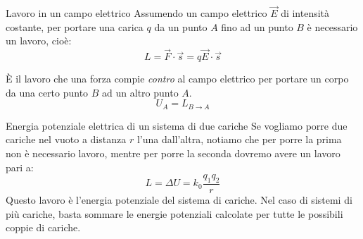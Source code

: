 \documentclass[a4paper,11pt,italian]{article}
\begin{document}
\begin{description}
\begin{soloscientifico} %
  
  \item[Lavoro in un campo elettrico] 
  Assumendo un campo elettrico $ \vec{E} $ di intensità costante, per portare una carica $ q $ da un punto $ A $ fino ad un punto $ B $ è necessario un lavoro, cioè:
  \[ L = \vec{F} \cdot \vec{s} = q \vec{E} \cdot \vec{s}  \]\end{soloscientifico}   %

  \item[Energia potenziale elettrica in \textit{A} (rispetto a \textit{B})] 
  È il lavoro che una forza compie \emph{contro} al campo elettrico per portare un corpo da una certo punto $ B $ ad un altro punto $ A $.
  \[ U_A = L_{B\rightarrow A} \]
  
\begin{soloscientifico} %
  \item[Energia potenziale elettrica di un sistema di due cariche] 
  Se vogliamo porre due cariche nel vuoto a distanza $ r $ l'una dall'altra, notiamo che per porre la prima non è necessario lavoro, mentre per porre la seconda dovremo avere un lavoro pari a:
  \[ L = \Delta U = k_0 \frac{q_1 q_2}{r}  \]
  Questo lavoro è l'energia potenziale del sistema di cariche. Nel caso di sistemi di più cariche, basta sommare le energie potenziali calcolate per tutte le possibili coppie di cariche.
  

\end{soloscientifico}
\end{description}
\end{document}
